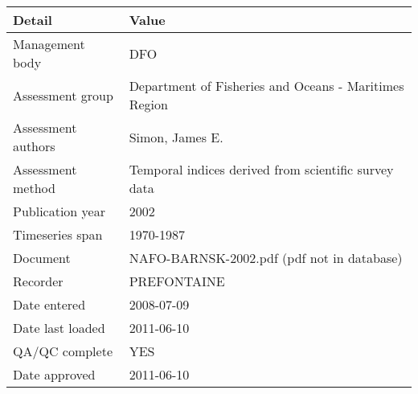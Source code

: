\begin{table}[htb]
\centering
\begin{tabular}{lp{7cm}}
\toprule
Detail & Value \\
\midrule
Management body    & DFO                                                   \\
Assessment group   & Department of Fisheries and Oceans - Maritimes Region \\
Assessment authors & Simon, James E.                                       \\
Assessment method  & Temporal indices derived from scientific survey data  \\
Publication year   & 2002                                                  \\
Timeseries span    & 1970-1987                                             \\
Document           & NAFO-BARNSK-2002.pdf (pdf not in database)            \\
Recorder           & PREFONTAINE                                           \\
Date entered       & 2008-07-09                                            \\
Date last loaded   & 2011-06-10                                            \\
QA/QC complete     & YES                                                   \\
Date approved      & 2011-06-10                                            \\
\bottomrule
\end{tabular}
\label{tab:assessdet}
\end{table}
